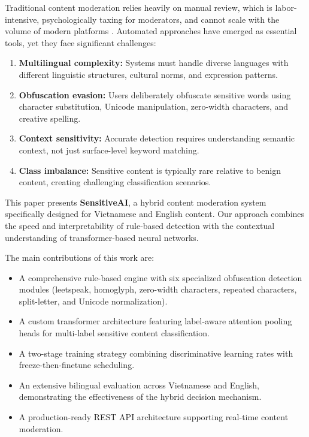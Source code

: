 \documentclass[12pt,a4paper]{article}
\begin{document}
Traditional content moderation relies heavily on manual review, which is labor-intensive, psychologically taxing for moderators, and cannot scale with the volume of modern platforms \cite{kaplan2021moderating}.
Automated approaches have emerged as essential tools, yet they face significant challenges:

\begin{enumerate}[leftmargin=*,label=(\roman*)]
    \item \textbf{Multilingual complexity:} Systems must handle diverse languages with different linguistic structures, cultural norms, and expression patterns.
    \item \textbf{Obfuscation evasion:} Users deliberately obfuscate sensitive words using character substitution, Unicode manipulation, zero-width characters, and creative spelling.
    \item \textbf{Context sensitivity:} Accurate detection requires understanding semantic context, not just surface-level keyword matching.
    \item \textbf{Class imbalance:} Sensitive content is typically rare relative to benign content, creating challenging classification scenarios.
\end{enumerate}

This paper presents \textbf{SensitiveAI}, a hybrid content moderation system specifically designed for Vietnamese and English content.
Our approach combines the speed and interpretability of rule-based detection with the contextual understanding of transformer-based neural networks.

The main contributions of this work are:

\begin{itemize}[leftmargin=*]
    \item A comprehensive rule-based engine with six specialized obfuscation detection modules (leetspeak, homoglyph, zero-width characters, repeated characters, split-letter, and Unicode normalization).
    \item A custom transformer architecture featuring label-aware attention pooling heads for multi-label sensitive content classification.
    \item A two-stage training strategy combining discriminative learning rates with freeze-then-finetune scheduling.
    \item An extensive bilingual evaluation across Vietnamese and English, demonstrating the effectiveness of the hybrid decision mechanism.
    \item A production-ready REST API architecture supporting real-time content moderation.
\end{itemize}
\end{document}
